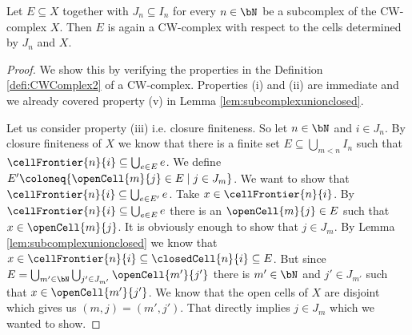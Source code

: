 \begin{lem}
    Let $E \subseteq X$ together with $J_n \subseteq I_n$ for every $n \in \bN$ be a subcomplex of the CW-complex $X$. 
    Then $E$ is again a CW-complex with respect to the cells determined by $J_n$ and $X$.
    \href{https://github.com/scholzhannah/CWComplexes/blob/7be4872a05b534011cc969eb5b80a4b7f0bf57e2/CWcomplexes/subcomplex.lean#L117-L174}{\faExternalLink}
\end{lem}
\begin{proof}
    We show this by verifying the properties in the Definition \ref{defi:CWComplex2} of a CW-complex. 
    Properties (i) and (ii) are immediate and we already covered property (v) in Lemma \ref{lem:subcomplexunionclosed}.

    Let us consider property (iii) i.e. closure finiteness. 
    So let $n \in \bN$ and $i \in J_n$. 
    By closure finiteness of $X$ we know that there is a finite set $E \subseteq \bigcup_{m < n} I_n$ such that $\cellFrontier{n}{i} \subseteq \bigcup_{e \in E}e$. 
    We define $E' \coloneq \{\openCell{m}{j} \in E \mid j \in J_m\}$. 
    We want to show that $\cellFrontier{n}{i} \subseteq \bigcup_{e \in E'}e$. 
    Take $x \in \cellFrontier{n}{i}$. 
    By $\cellFrontier{n}{i} \subseteq \bigcup_{e \in E}e$ there is an $\openCell{m}{j} \in E$ such that $x \in \openCell{m}{j}$. 
    It is obviously enough to show that $j \in J_m$. 
    By Lemma \ref{lem:subcomplexunionclosed} we know that $x \in \cellFrontier{n}{i} \subseteq \closedCell{n}{i} \subseteq E$.
    But since $E = \bigcup_{m' \in \bN} \bigcup_{j' \in J_{m'}} \openCell{m'}{j'}$ there is $m' \in \bN$ and $j' \in J_{m'}$ such that $x \in \openCell{m'}{j'}$. 
    We know that the open cells of $X$ are disjoint which gives us $(m, j) = (m', j')$. 
    That directly implies $j \in J_m$ which we wanted to show. 


\end{proof}
